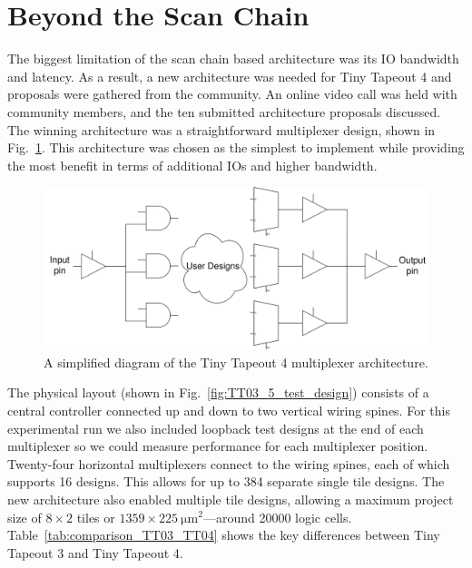 \section{Beyond the Scan Chain}
\label{sec:beyond_scanchain}
The biggest limitation of the scan chain based architecture was its IO bandwidth and latency.
As a result, a new architecture was needed for Tiny Tapeout 4 and proposals were gathered from the community.
An online video call was held with community members, and the ten submitted architecture proposals discussed.
The winning architecture was a straightforward multiplexer design, shown in Fig.~\ref{fig:multiplexer_design}. This architecture was chosen as the simplest to implement while providing the most benefit in terms of additional IOs and higher bandwidth.

\begin{figure}[!t]
\centering
\includegraphics[width=\columnwidth]{./Figs/mux architecture.png}
\caption{A simplified diagram of the Tiny Tapeout 4 multiplexer architecture.}
\label{fig:multiplexer_design}
\end{figure}

The physical layout (shown in Fig.~\ref{fig:TT03_5_test_design}) consists of a central controller connected up and down to two vertical wiring spines.
For this experimental run we also included loopback test designs at the end of each multiplexer so we could measure performance for each multiplexer position.
Twenty-four horizontal multiplexers connect to the wiring spines, each of which supports 16 designs.
This allows for up to 384 separate single tile designs.
The new architecture also enabled multiple tile designs, allowing a maximum project size of $8 \times 2$ tiles or $1359 \times \qty{225}{\um\squared}$---around \num{20000} logic cells. Table~\ref{tab:comparison_TT03_TT04} shows the key differences between Tiny Tapeout 3 and Tiny Tapeout 4.

